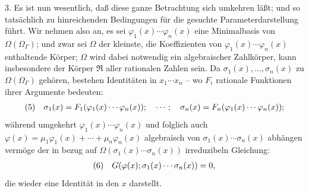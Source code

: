 3. Es ist nun wesentlich, daß diese ganze Betrachtung sich umkehren läßt; und so tatsächlich zu hinreichenden Bedingungen für die gesuchte Parameterdarstellung führt. Wir nehmen also an, es sei $\varphi_1(x)\cdots\varphi_n(x)$ eine Minimalbasis von $\Omega(\Omega_\Gamma)$; und zwar sei $\Omega$ der kleinste, die Koeffizienten von $\varphi_1(x)\cdots\varphi_n(x)$ enthaltende Körper; $\Omega$ wird dabei notwendig ein algebraischer Zahlkörper, kann insbesondere der Körper $\mathfrak R$ aller rationalen Zahlen sein. Da $\sigma_1(x),\ldots,\sigma_n(x)$ zu $\Omega(\Omega_\Gamma)$ gehören, bestehen Identitäten in $x_1\cdots x_n$ -- wo $F_i$ rationale Funktionen ihrer Argumente bedeuten:
\[
\begin{array}{@{}l@{\quad}l@{}}
(5)& \displaystyle \sigma_1(x)=F_1(\varphi_1(x)\cdots\varphi_n(x));\quad \cdots;\quad \sigma_n(x)=F_n(\varphi_1(x)\cdots\varphi_n(x));
\end{array}
\]
während umgekehrt $\varphi_1(x)\cdots\varphi_n(x)$ und folglich auch $\varphi(x)=\mu_1\varphi_1(x)+\cdots+\mu_n\varphi_n(x)$ algebraisch von $\sigma_1(x)\cdots\sigma_n(x)$ abhängen vermöge der in bezug auf $\Omega(\sigma_1(x)\cdots\sigma_n(x))$ irreduzibeln Gleichung:
\[
\begin{array}{@{}l@{\quad}l@{}}
(6)& \displaystyle G(\varphi(x);\sigma_1(x)\cdots\sigma_n(x))=0,
\end{array}
\]
die wieder eine Identität in den $x$ darstellt.


